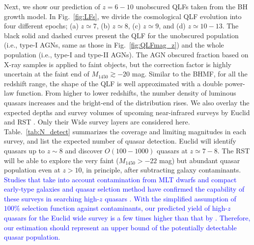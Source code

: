 \documentclass[twocolumn, twocolappendix]{aastex63}
\newcommand{\Muv}{M_{1450}}
\newcommand{\blue}[1]{\textcolor{blue}{ #1}}
\begin{document}
\begin{CJK*}{UTF8}{gbsn}
Next, we show our prediction of $z=6-10$ unobscured QLFs taken from the BH growth model.
In Fig.~\ref{fig:LFs}, we divide the cosmological QLF evolution into four different epochs; (a) $z\simeq 7$, (b) $z\simeq 8$, (c) $z\simeq 9$, and (d) $z\simeq 10-13$.
The black solid and dashed curves present the QLF for the unobscured population (i.e., type-I AGNs, same as those in Fig.~\ref{fig:QLFmag_z})
and the whole population (i.e., type-I and type-II AGNs).
The AGN obscured fraction based on X-ray samples \citep{2014ApJ...786..104U} is applied to faint objects, 
but the correction factor is highly uncertain at the faint end of $\Muv\gtrsim -20$ mag.
Similar to the BHMF, for all the redshift range, the shape of the QLF is well approximated with a double power-law function.
From higher to lower redshifts, the number density of luminous quasars increases and the bright-end of the distribution rises.
We also overlay the expected depths and survey volumes of upcoming near-infrared surveys by
Euclid \citep{2011arXiv1110.3193L} and RST \citep{2019arXiv190205569A}.
Only their Wide survey layers are considered here.
Table.~\ref{tab:N_detect} summarizes the coverage and limiting magnitudes in each survey,
and list the expected number of quasar detection.
Euclid will identify quasars up to $z\sim 8$ and discover $O(100-1000)$ quasars at $z\simeq 7-8$.
The RST will be able to explore the very faint ($\Muv>-22$ mag) but abundant quasar population even at $z>10$, in principle,
after subtracting galaxy contaminants.
\blue{
Studies that take into account contamination from MLT dwarfs and compact early-type galaxies and quasar selction method
have confirmed the capability of these surveys in searching high-$z$ quasars \citep{2019A&A...631A..85E,2019BAAS...51c.121F}.
With the simplified assumption of $100\%$ selection function against contaminants,
our predicted yield of high-$z$ quasars for the Euclid wide survey is a few times higher than that by \citet{2019A&A...631A..85E}.
Therefore, our estimation should represent an upper bound of the potentially detectable quasar population.
}


\end{CJK*}
\end{document}

